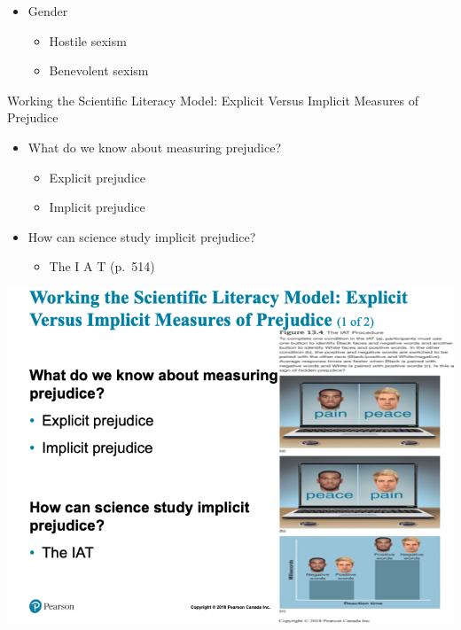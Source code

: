 \documentclass[
]{book}
\providecommand{\tightlist}{%
  \setlength{\itemsep}{0pt}\setlength{\parskip}{0pt}}
\begin{document}
\begin{reflect}
\begin{itemize}
  \begin{itemize}
  \tightlist
  \item
    Gender

    \begin{itemize}
    \tightlist
    \item
      Hostile sexism\\
    \item
      Benevolent sexism
    \end{itemize}
  \end{itemize}
\end{itemize}

Working the Scientific Literacy Model: Explicit Versus Implicit Measures of Prejudice

\begin{itemize}
\tightlist
\item
  What do we know about measuring prejudice?

  \begin{itemize}
  \tightlist
  \item
    Explicit prejudice\\
  \item
    Implicit prejudice\\
  \end{itemize}
\item
  How can science study implicit prejudice?

  \begin{itemize}
  \tightlist
  \item
    The I A T (p.~514)
  \end{itemize}
\end{itemize}

\includegraphics{assets/unit_6/slide_37.png}


\end{reflect}
\end{document}
